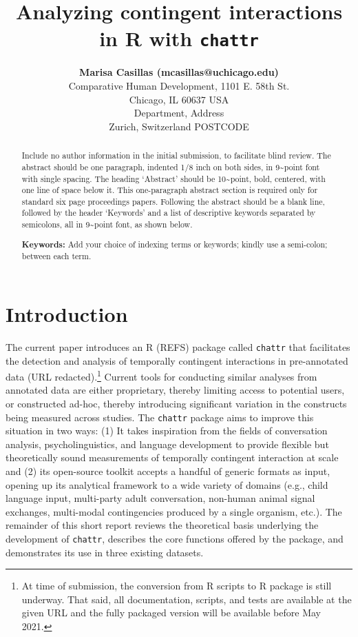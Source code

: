 \documentclass[10pt, letterpaper]{article}
\title{Analyzing contingent interactions in R with \texttt{chattr}}
\author{{\large \bf Marisa Casillas (mcasillas@uchicago.edu)} \\ Comparative Human Development, 1101 E. 58th St. \\ Chicago, IL 60637 USA \AND {\large \bf Camila Scaff (camiscaff@hotmail.com)} \\ Department, Address \\ Zurich, Switzerland POSTCODE}
\begin{document}
\maketitle

\begin{abstract}
Include no author information in the initial submission, to facilitate
blind review. The abstract should be one paragraph, indented 1/8 inch on
both sides, in 9\textasciitilde point font with single spacing. The
heading `Abstract' should be 10\textasciitilde point, bold, centered,
with one line of space below it. This one-paragraph abstract section is
required only for standard six page proceedings papers. Following the
abstract should be a blank line, followed by the header `Keywords' and a
list of descriptive keywords separated by semicolons, all in
9\textasciitilde point font, as shown below.

\textbf{Keywords:}
Add your choice of indexing terms or keywords; kindly use a semi-colon;
between each term.
\end{abstract}

\hypertarget{introduction}{%
\section{Introduction}\label{introduction}}

The current paper introduces an R (REFS) package called \texttt{chattr}
that facilitates the detection and analysis of temporally contingent
interactions in pre-annotated data (URL redacted).\footnote{At time of
  submission, the conversion from R scripts to R package is still
  underway. That said, all documentation, scripts, and tests are
  available at the given URL and the fully packaged version will be
  available before May 2021.} Current tools for conducting similar
analyses from annotated data are either proprietary, thereby limiting
access to potential users, or constructed ad-hoc, thereby introducing
significant variation in the constructs being measured across studies.
The \texttt{chattr} package aims to improve this situation in two ways:
(1) It takes inspiration from the fields of conversation analysis,
psycholinguistics, and language development to provide flexible but
theoretically sound measurements of temporally contingent interaction at
scale and (2) its open-source toolkit accepts a handful of generic
formats as input, opening up its analytical framework to a wide variety
of domains (e.g., child language input, multi-party adult conversation,
non-human animal signal exchanges, multi-modal contingencies produced by
a single organism, etc.). The remainder of this short report reviews the
theoretical basis underlying the development of \texttt{chattr},
describes the core functions offered by the package, and demonstrates
its use in three existing datasets.
\end{document}
